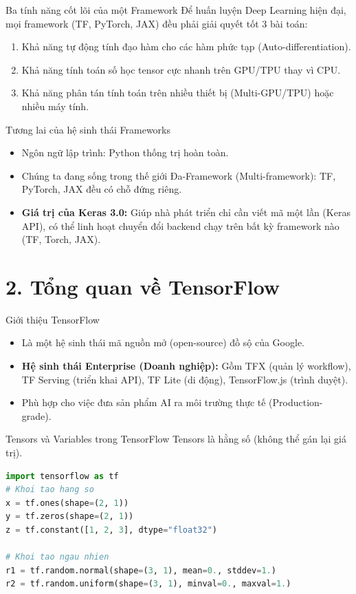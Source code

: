 \documentclass[aspectratio=169]{beamer}
\begin{document}
\begin{frame}{Ba tính năng cốt lõi của một Framework}
    Để huấn luyện Deep Learning hiện đại, mọi framework (TF, PyTorch, JAX) đều phải giải quyết tốt 3 bài toán:
    \begin{enumerate}
        \item Khả năng tự động tính đạo hàm cho các hàm phức tạp (Auto-differentiation).
        \item Khả năng tính toán số học tensor cực nhanh trên GPU/TPU thay vì CPU.
        \item Khả năng phân tán tính toán trên nhiều thiết bị (Multi-GPU/TPU) hoặc nhiều máy tính.
    \end{enumerate}
\end{frame}

\begin{frame}{Tương lai của hệ sinh thái Frameworks}
    \begin{itemize}
        \item Ngôn ngữ lập trình: Python thống trị hoàn toàn.
        \item Chúng ta đang sống trong thế giới Đa-Framework (Multi-framework): TF, PyTorch, JAX đều có chỗ đứng riêng.
        \item \textbf{Giá trị của Keras 3.0:} Giúp nhà phát triển chỉ cần viết mã một lần (Keras API), có thể linh hoạt chuyển đổi backend chạy trên bất kỳ framework nào (TF, Torch, JAX).
    \end{itemize}
\end{frame}

\section{2. Tổng quan về TensorFlow}

\begin{frame}{Giới thiệu TensorFlow}
    \begin{itemize}
        \item Là một hệ sinh thái mã nguồn mở (open-source) đồ sộ của Google.
        \item \textbf{Hệ sinh thái Enterprise (Doanh nghiệp):} Gồm TFX (quản lý workflow), TF Serving (triển khai API), TF Lite (di động), TensorFlow.js (trình duyệt).
        \item Phù hợp cho việc đưa sản phẩm AI ra môi trường thực tế (Production-grade).
    \end{itemize}
\end{frame}

\begin{frame}[fragile]{Tensors và Variables trong TensorFlow}
    Tensors là hằng số (không thể gán lại giá trị).
    \begin{lstlisting}[language=Python]
import tensorflow as tf
# Khoi tao hang so
x = tf.ones(shape=(2, 1))
y = tf.zeros(shape=(2, 1))
z = tf.constant([1, 2, 3], dtype="float32")

# Khoi tao ngau nhien
r1 = tf.random.normal(shape=(3, 1), mean=0., stddev=1.)
r2 = tf.random.uniform(shape=(3, 1), minval=0., maxval=1.)
    \end{lstlisting}
\end{frame}
\end{document}
